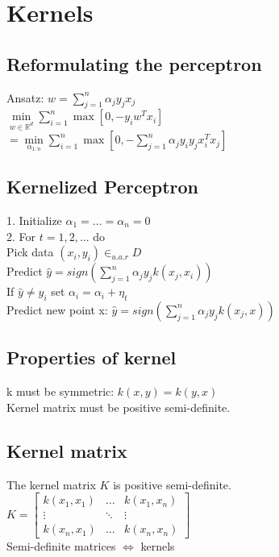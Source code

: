 \section*{Kernels}

\subsection*{Reformulating the perceptron}

Ansatz: $w=\sum_{j=1}^n \alpha_j y_j x_j$\\
$\min \limits_{w\in\mathbb{R}^d} \sum_{i=1}^n \max [0, -y_i w^T x_i]$\\
$= \min \limits_{\alpha_{1:n}} \sum_{i=1}^n \max  [0,- \sum_{j=1}^n \alpha_j y_i y_j x_i^T x_j ]$


\subsection*{Kernelized Perceptron}
1. Initialize $\alpha_1 = ... = \alpha_n = 0$\\
2. For $t = 1, 2, ...$ do \\
Pick data $(x_i,y_i) \in_{u.a.r} D$\\
Predict $\hat{y} = sign(\sum_{j=1}^n \alpha_j y_j k(x_j,x_i))$\\
If $\hat{y} \not = y_i$ set $\alpha_i = \alpha_i + \eta_t$\\
Predict new point x: $\hat{y} = sign(\sum_{j=1}^n \alpha_j y_j k(x_j,x))$

\subsection*{Properties of kernel}
k must be symmetric: $k(x,y) = k(y,x)$\\
Kernel matrix must be positive semi-definite.

\subsection*{Kernel matrix}
The kernel matrix $K$ is positive semi-definite.\\
$K = 
\begin{bmatrix}
	k(x_1,x_1) & \dots & k(x_1,x_n) \\
	\vdots & \ddots & \vdots \\
	k(x_n, x_1) & \dots & k(x_n,x_n)
\end{bmatrix}$\\
Semi-definite matrices $\Leftrightarrow$ kernels


